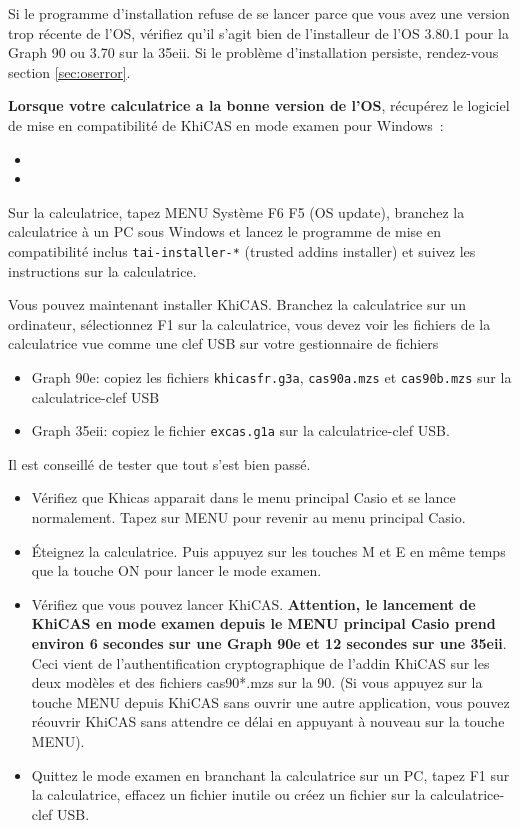 \documentclass{article}
\begin{document}
\begin{giacjshere}
Si le programme d'installation refuse de se lancer parce que
vous avez une version trop récente de l'OS, vérifiez qu'il s'agit bien
de l'installeur de l'OS 3.80.1 pour la Graph 90 ou 3.70 sur la 35eii.
Si le problème d'installation persiste, rendez-vous section
\ref{sec:oserror}.

{\bf Lorsque votre calculatrice a la bonne version de l'OS}, 
récupérez le logiciel de mise en
compatibilité de KhiCAS en mode examen pour Windows~:
\begin{itemize}
\item {} 
\item {}
\end{itemize}
Sur la calculatrice, tapez MENU Système F6 F5 (OS update),
branchez la calculatrice à un PC sous Windows et
lancez le programme de mise en compatibilité inclus
\verb|tai-installer-*| (trusted addins installer)
et suivez les instructions sur la calculatrice. 

Vous pouvez maintenant installer KhiCAS. Branchez la calculatrice
sur un ordinateur, sélectionnez F1 sur la calculatrice, vous devez
voir les fichiers de la calculatrice vue comme une clef USB
sur votre gestionnaire de fichiers
\begin{itemize}
\item Graph 90e: copiez les fichiers {\tt khicasfr.g3a}, {\tt cas90a.mzs}
et {\tt cas90b.mzs} sur la calculatrice-clef USB
\item Graph 35eii: copiez le fichier {\tt excas.g1a} sur la
calculatrice-clef USB.
\end{itemize}

Il est conseillé de tester que tout s'est bien passé.
\begin{itemize}
\item Vérifiez que Khicas apparait dans le menu principal
Casio et se lance normalement. Tapez sur MENU pour revenir au menu principal
Casio.
\item \'Eteignez la calculatrice. Puis
appuyez sur les touches M et E
en même temps que la touche ON pour lancer le mode examen.
\item Vérifiez que vous pouvez lancer KhiCAS.
{\bf Attention, le lancement de KhiCAS en mode examen depuis le MENU 
principal Casio prend environ 6 secondes sur une Graph 90e et 
12 secondes sur une 35eii}.
Ceci vient de l'authentification cryptographique
de l'addin KhiCAS sur les deux modèles et des fichiers cas90*.mzs sur la 90. 
(Si vous appuyez sur la touche MENU depuis KhiCAS sans ouvrir une
autre application, vous pouvez réouvrir KhiCAS sans attendre ce
délai en appuyant à nouveau sur la touche MENU).
\item Quittez le mode examen en branchant la calculatrice sur un PC,
tapez F1 sur la calculatrice,
effacez un fichier inutile ou créez un fichier sur la calculatrice-clef USB.
\end{itemize}


\end{giacjshere}
\end{document}
